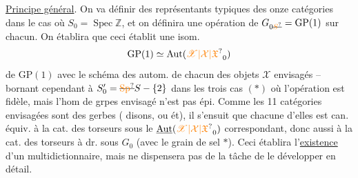 \uline{Principe général}. On va définir des représentants typiques des onze catégories dans le cas où $S_0=\operatorname{Spec}\mathbb Z$, et on définira une opération de $G_{0\deleted{\unsure{S}}}=\mathrm{GP}(1)$ sur chacun. On établira que ceci établit une isom.
\[
 \mathrm{GP}(1)\simeq\operatorname{Aut}(\unsure{\mathscr X|\mathcal X|\mathfrak X}_0)
\]
de $\mathrm{GP}(1)$ avec le schéma des autom. de chacun des objets $\mathscr X$ envisagés -- 
bornant cependant à  $S'_0=\deleted{\unsure{\mathrm{Sp}}}S-\{2\}$ dans les trois cas $(*)$ où l'opération  est fidèle, mais l'hom de grpes envisagé n'est pas épi.
Comme les 11 catégories  envisagées sont des gerbes ( disons, ou ét), il s'ensuit que chacune d'elles est can. équiv. à la cat. des torseurs  sous le $\underline{\operatorname{Aut}}(\unsure{\mathscr X|\mathcal X|\mathfrak X}_0)$ correspondant, donc aussi à la cat. des torseurs à dr. sous $G_0$ (avec le grain de sel $*$). Ceci établira l'\uline{existence} d'un multidictionnaire, mais ne  dispensera pas de la tâche de le développer en détail.


